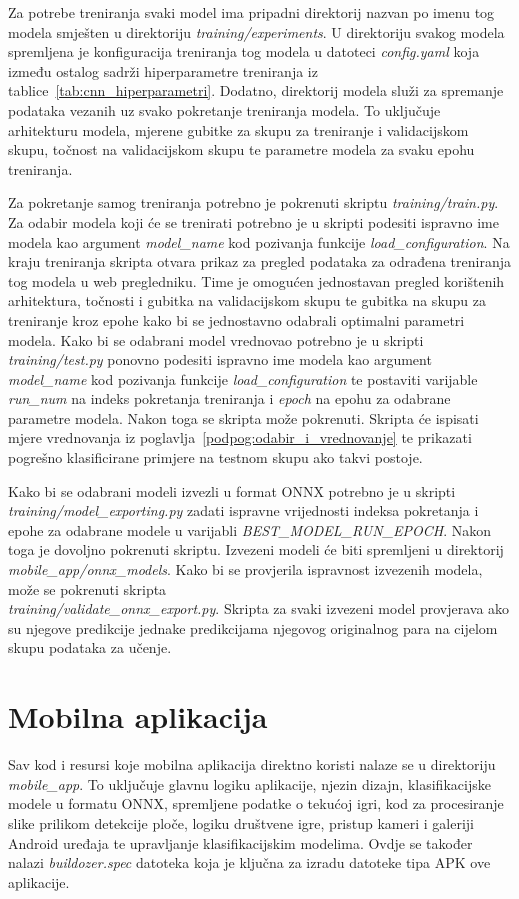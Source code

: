 \documentclass[diplomskirad]{fer}
\begin{document}
		Za potrebe treniranja svaki model ima pripadni direktorij nazvan po imenu tog modela smješten u direktoriju \textit{training/experiments}. U direktoriju svakog modela spremljena je konfiguracija treniranja tog modela u datoteci \textit{config.yaml} koja između ostalog sadrži hiperparametre treniranja iz tablice~\ref{tab:cnn_hiperparametri}. Dodatno, direktorij modela služi za spremanje podataka vezanih uz svako pokretanje treniranja modela. To uključuje arhitekturu modela, mjerene gubitke za skupu za treniranje i validacijskom skupu, točnost na validacijskom skupu te parametre modela za svaku epohu treniranja.
		
		Za pokretanje samog treniranja potrebno je pokrenuti skriptu \textit{training/train.py}. Za odabir modela koji će se trenirati potrebno je u skripti podesiti ispravno ime modela kao argument \textit{model\_name} kod pozivanja funkcije \textit{load\_configuration}. Na kraju treniranja skripta otvara prikaz za pregled podataka za odrađena treniranja tog modela u web pregledniku. Time je omogućen jednostavan pregled korištenih arhitektura, točnosti i gubitka na validacijskom skupu te gubitka na skupu za treniranje kroz epohe kako bi se jednostavno odabrali optimalni parametri modela. Kako bi se odabrani model vrednovao potrebno je u skripti \textit{training/test.py} ponovno podesiti ispravno ime modela kao argument \textit{model\_name} kod pozivanja funkcije \textit{load\_configuration} te postaviti varijable \textit{run\_num} na indeks pokretanja treniranja i \textit{epoch} na epohu za odabrane parametre modela. Nakon toga se skripta može pokrenuti. Skripta će ispisati mjere vrednovanja iz poglavlja~\ref{podpog:odabir_i_vrednovanje} te prikazati pogrešno klasificirane primjere na testnom skupu ako takvi postoje.
		
		Kako bi se odabrani modeli izvezli u format ONNX potrebno je u skripti\\\textit{training/model\_exporting.py} zadati ispravne vrijednosti indeksa pokretanja i epohe za odabrane modele u varijabli \textit{BEST\_MODEL\_RUN\_EPOCH}. Nakon toga je dovoljno pokrenuti skriptu. Izvezeni modeli će biti spremljeni u direktorij \textit{mobile\_app/onnx\_models}. Kako bi se provjerila ispravnost izvezenih modela, može se pokrenuti skripta\\\textit{training/validate\_onnx\_export.py}. Skripta za svaki izvezeni model provjerava ako su njegove predikcije jednake predikcijama njegovog originalnog para na cijelom skupu podataka za učenje.
	
	\section{Mobilna aplikacija}
		Sav kod i resursi koje mobilna aplikacija direktno koristi nalaze se u direktoriju \textit{mobile\_app}. To uključuje glavnu logiku aplikacije, njezin dizajn, klasifikacijske modele u formatu ONNX, spremljene podatke o tekućoj igri, kod za procesiranje slike prilikom detekcije ploče, logiku društvene igre, pristup kameri i galeriji Android uređaja te upravljanje klasifikacijskim modelima. Ovdje se također nalazi \textit{buildozer.spec} datoteka koja je ključna za izradu datoteke tipa APK ove aplikacije.
		
\end{document}
